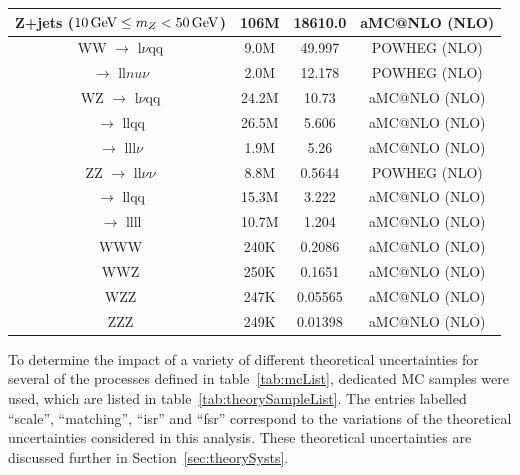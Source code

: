 \begin{table}[htbp]
{\begin{tabular}{cccc}
   Z+jets ($10 \,\text{Ge\hspace{-.08em}V} \leq m_{Z} < 50\,\text{Ge\hspace{-.08em}V}$) & 106M & 18610.0 & aMC@NLO (NLO) \\
   \hline
   WW $\rightarrow$ l$\nu$qq & 9.0M & 49.997  & POWHEG (NLO) \\
      $\rightarrow$ ll$nu\nu$ & 2.0M & 12.178 & POWHEG (NLO) \\
   \hline
   WZ $\rightarrow$ l$\nu$qq & 24.2M & 10.73 & aMC@NLO (NLO) \\
      $\rightarrow$ llqq & 26.5M & 5.606 & aMC@NLO (NLO) \\
      $\rightarrow$ lll$\nu$ & 1.9M & 5.26 & aMC@NLO (NLO) \\
   \hline
   ZZ $\rightarrow$ ll$\nu\nu$ & 8.8M & 0.5644 & POWHEG (NLO) \\
      $\rightarrow$ llqq & 15.3M & 3.222 & aMC@NLO (NLO) \\
      $\rightarrow$ llll & 10.7M & 1.204 & aMC@NLO (NLO) \\
   \hline
   WWW & 240K & 0.2086 & aMC@NLO (NLO) \\
   \hline
   WWZ & 250K & 0.1651 & aMC@NLO (NLO) \\
   \hline
   WZZ & 247K & 0.05565 & aMC@NLO (NLO) \\
   \hline
   ZZZ & 249K & 0.01398 & aMC@NLO (NLO) \\
   \hline
   
 \end{tabular}}
\end{table}

To determine the impact of a variety of different theoretical uncertainties for several of the processes defined in table~\ref{tab:mcList}, dedicated MC samples were used, which are listed in table~\ref{tab:theorySampleList}.
The entries labelled ``scale'', ``matching'', ``isr'' and ``fsr'' correspond to the variations of the theoretical uncertainties considered in this analysis.
These theoretical uncertainties are discussed further in Section~\ref{sec:theorySysts}.

